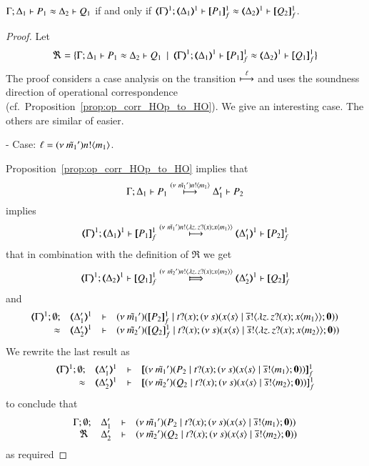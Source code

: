 \begin{proposition}\rm
	$\Gamma; \Delta_1 \vdash P_1 \approx \Delta_2 \vdash Q_1$
	if and only if
	$\horel{\mapt{\Gamma}^{1}}{\mapt{\Delta_1}^{1}}{\pmapp{P_1}{1}{f}}{\wb}{\mapt{\Delta_2}^{1}}{\pmapp{Q_2}{1}{f}}$.
\end{proposition}

\begin{proof}

	\noi Let
%
	\[
		\Re = \set{\horel{\Gamma}{\Delta_1}{P_1}{\wb}{\Delta_2}{Q_1} \setbar \horel{\mapt{\Gamma}^{1}}{\mapt{\Delta_1}^{1}}{\pmapp{P_1}{1}{f}}{\wb}{\mapt{\Delta_2}^{1}}{\pmapp{Q_1}{1}{f}}}
	\]
%
	\noi	The proof considers a case analysis on the transition $\stackrel{\ell}{\longmapsto}$ and
		uses the soundness direction of operational correspondence (cf.~Proposition~\ref{prop:op_corr_HOp_to_HO}).
		We give an interesting case. The others are similar of easier.

	\noi	- Case: $\ell = (\nu\ \tilde{m_1}') n ! \langle m_1 \rangle$.

	\noi Proposition~\ref{prop:op_corr_HOp_to_HO} implies that
%
	\[
		\Gamma; \Delta_1 \vdash P_1 \stackrel{(\nu\ \tilde{m_1}') n ! \langle m_1 \rangle}{\longmapsto} \Delta_1' \vdash P_2
	\]
%
	\noi implies
%
	\[
		\horel{\mapt{\Gamma}^{1}}{\mapt{\Delta_1}^{1}}{\pmapp{P_1}{1}{f}}{\hby{\news{\tilde{m_1}'} \bactout{n}{\abs{z}{\binp{z}{x} \appl{x}{m_1}}}}}{\mapt{\Delta_1'}^{1}}{\pmapp{P_2}{1}{f}}
	\]
%
	\noi that in combination with the definition of $\Re$ we get
%
	\begin{eqnarray}
		\horel{\mapt{\Gamma}^{1}}{\mapt{\Delta_2}^{1}}{\pmapp{Q_1}{1}{f}}{\Hby{\news{\tilde{m_2}'} \bactout{n}{\abs{z}{\binp{z}{x} \appl{x}{m_2}}}}}{\mapt{\Delta_2'}^{1}}{\pmapp{Q_2}{1}{f}}
		\label{prop:HOp_to_HO:full_abs11}
	\end{eqnarray}
%
	\noi and
%
	\[
		\mhorel{\mapt{\Gamma}^{1}}{\mapt{\Delta_1'}^{1}}{\newsp{\tilde{m_1}'}{\pmapp{P_2}{1}{f} \Par \hotrigger{t}{x}{s}{\abs{z}{\binp{z}{x} \appl{x}{m_1}}} }}
		{\wb}{\mapt{\Delta_2'}^{1}}{}{\newsp{\tilde{m_2}'}{\pmapp{Q_2}{1}{f} \Par \hotrigger{t}{x}{s}{\abs{z}{\binp{z}{x} \appl{x}{m_2}}}}}
	\]
%
	\noi We rewrite the last result as
	\[
		\mhorel{\mapt{\Gamma}^{1}}{\mapt{\Delta_1'}^{1}}{\pmapp{\newsp{\tilde{m_1}'}{P_2 \Par \hotrigger{t}{x}{s}{m_1}}}{1}{f}}
		{\wb}{\mapt{\Delta_2'}^{1}}{}{\pmapp{\newsp{\tilde{m_2}'}{Q_2 \Par \hotrigger{t}{x}{s}{m_2}}}{1}{f}}
	\]
%
	\noi to conclude that
%
	\[
		\begin{array}{rcll} \Gamma; \emptyset; &\Delta_1'& \vdash& (\nu\ \tilde{m_1}')(P_2 \;|\; t ? (x) ; (\nu\ s)(x\langle s \rangle \;|\; \overline{s} ! \langle m_1 \rangle ; \mathbf{0}))\\ \ \Re\  &\Delta_2'& \vdash &  (\nu\ \tilde{m_2}')(Q_2 \;|\; t ? (x) ; (\nu\ s)(x\langle s \rangle \;|\; \overline{s} ! \langle m_2 \rangle ; \mathbf{0})) \end{array}
	\]
%
	\noi as required



\end{proof}

